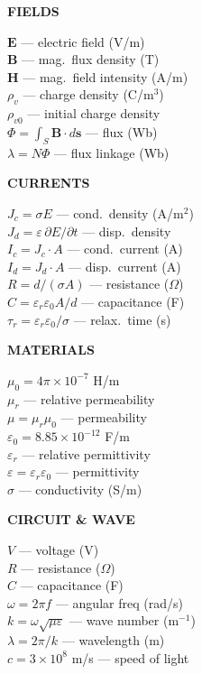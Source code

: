 \documentclass[6pt,letterpaper]{article}
\newcommand{\shead}[3]{%
  \noindent\colorbox{#1}{\parbox{\dimexpr\linewidth-2\fboxsep\relax}%
  {\color{#2}\bfseries\fontsize{6}{7}\selectfont #3}}\vspace{0.5pt}}
\begin{document}
\vfill
\vspace{2pt}
\noindent
\begin{minipage}[t]{0.19\linewidth}
\shead{purplebg}{purple}{FIELDS}
\begin{ebox}
$\mathbf{E}$ — electric field (V/m)\\
$\mathbf{B}$ — mag.\ flux density (T)\\
$\mathbf{H}$ — mag.\ field intensity (A/m)\\
$\rho_v$ — charge density (C/m$^3$)\\
$\rho_{v0}$ — initial charge density\\
$\Phi=\int_S\mathbf{B}\cdot d\mathbf{s}$ — flux (Wb)\\
$\lambda=N\Phi$ — flux linkage (Wb)
\end{ebox}
\end{minipage}\hfill
\begin{minipage}[t]{0.19\linewidth}
\shead{tealbg}{teal}{CURRENTS}
\begin{ebox}
$J_c=\sigma E$ — cond.\ density (A/m$^2$)\\
$J_d=\varepsilon\,\partial E/\partial t$ — disp.\ density\\
$I_c=J_c\cdot A$ — cond.\ current (A)\\
$I_d=J_d\cdot A$ — disp.\ current (A)\\
$R=d/(\sigma A)$ — resistance ($\Omega$)\\
$C=\varepsilon_r\varepsilon_0 A/d$ — capacitance (F)\\
$\tau_r=\varepsilon_r\varepsilon_0/\sigma$ — relax.\ time (s)
\end{ebox}
\end{minipage}\hfill
\begin{minipage}[t]{0.19\linewidth}
\shead{coralbg}{coral}{MATERIALS}
\begin{ebox}
$\mu_0=4\pi\!\times\!10^{-7}$ H/m\\
$\mu_r$ — relative permeability\\
$\mu=\mu_r\mu_0$ — permeability\\[2pt]
$\varepsilon_0=8.85\!\times\!10^{-12}$ F/m\\
$\varepsilon_r$ — relative permittivity\\
$\varepsilon=\varepsilon_r\varepsilon_0$ — permittivity\\[2pt]
$\sigma$ — conductivity (S/m)
\end{ebox}
\end{minipage}\hfill
\begin{minipage}[t]{0.19\linewidth}
\shead{bluebg}{blue}{CIRCUIT \& WAVE}
\begin{ebox}
$V$ — voltage (V)\\
$R$ — resistance ($\Omega$)\\
$C$ — capacitance (F)\\
$\omega=2\pi f$ — angular freq (rad/s)\\
$k=\omega\sqrt{\mu\varepsilon}$ — wave number (m$^{-1}$)\\
$\lambda=2\pi/k$ — wavelength (m)\\
$c=3\!\times\!10^8$ m/s — speed of light
\end{ebox}
\end{minipage}\hfill
\end{document}
